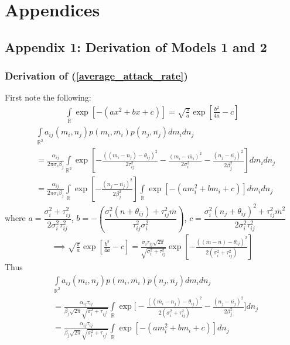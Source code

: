 \documentclass{amsart}
\theoremstyle{definition}
\theoremstyle{remark}
\numberwithin{equation}{section}
\begin{document}
\section{Appendices}
\subsection{Appendix 1: Derivation of Models 1 and 2}
\subsubsection{Derivation of (\ref{average_attack_rate})}
First note the following:
\begin{align*}
	\int\limits_{\mathbb{R}}\exp\left[-(ax^2 + bx + c)\right] = \sqrt{\frac{\pi}{a}}\exp\left[\frac{b^2}{4a} - c\right]
\end{align*}
\begin{align*}
	&\int\limits_{\mathbb{R}^2}a_{ij}(m_i, n_j)p(m_i, \overline{m_i})p(n_j, \overline{n_j})dm_idn_j \\
	&= \frac{\alpha_{ij}}{2\pi\sigma_i\beta_j}\int\limits_{\mathbb{R}^2}\exp\left[-\frac{((m_i - n_j) - \theta_{ij})^2}{2\tau_{ij}^2} - \frac{(m_i - \overline{m_i})^2}{2\sigma_i^2} - \frac{(n_j - \overline{n_j})^2}{2\beta_j^2}\right]dm_idn_j \\
	&= \frac{\alpha_{ij}}{2\pi\sigma_i\beta_j}\int\limits_{\mathbb{R}}\exp\left[-\frac{(n_j - \overline{n_j})^2}{2\beta_j^2}\right]\int\limits_{\mathbb{R}}\exp\left[-(am_i^2 + bm_i + c)\right]dm_idn_j
\end{align*}
where $a = \dfrac{\sigma_i^2 + \tau_{ij}^2}{2\sigma_i^2\tau_{ij}^2}$, $b = -\left(\dfrac{\sigma_i^2(n + \theta_{ij}) + \tau_{ij}^2\overline{m}}{\tau_{ij}^2\sigma_i^2}\right)$, $c = \dfrac{\sigma_i^2(n_j + \theta_{ij})^2 + \tau_{ij}^2\overline{m}^2}{2\sigma_i^2\tau_{ij}^2}$
\begin{align*}
	\implies \sqrt{\frac{\pi}{a}}\exp\left[\frac{b^2}{4a} - c\right] = \frac{\sigma_i\tau_{ij}\sqrt{2\pi}}{\sqrt{\sigma_i^2 + \tau_{ij}^2}}\exp\left[-\frac{((\overline{m} - n) - \theta_{ij})^2}{2(\sigma_i^2 + \tau_{ij}^2)}\right]
\end{align*}
Thus
\begin{align*}
	&\int\limits_{\mathbb{R}^2}a_{ij}(m_i, n_j)p(m_i, \overline{m_i})p(n_j, \overline{n_j})dm_idn_j \\
	&= \frac{\alpha_{ij}\tau_{ij}}{\beta_j\sqrt{2\pi}\sqrt{\sigma_i^2 + \tau_{ij^2}}}\int\limits_{\mathbb{R}}\exp\Bigg[-\frac{((\overline{m_i} - n_j) - \theta_{ij})^2}{2(\sigma_i^2 + \tau_{ij}^2)} - \frac{(n_j - \overline{n_j})^2}{2\beta_j^2}\Bigg]dn_j \\
	&= \frac{\alpha_{ij}\tau_{ij}}{\beta_j\sqrt{2\pi}\sqrt{\sigma_i^2 + \tau_{ij^2}}}\int\limits_{\mathbb{R}}\exp\left[-(am_i^2 + bm_i + c)\right]dn_j
\end{align*}
\end{document}
